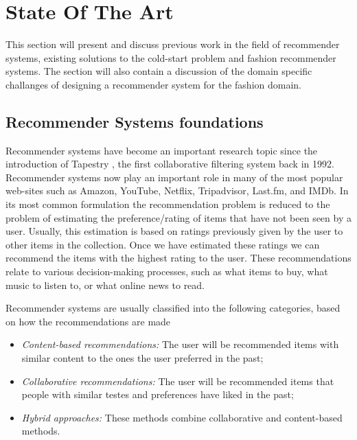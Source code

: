 
\section{State Of The Art}
\label{sec:SotA}

This section will present and discuss previous work in the field of recommender systems, existing solutions to the cold-start problem and fashion recommender systems. The section will also contain a discussion of the domain specific challanges of designing a recommender system for the fashion domain. 

\subsection{Recommender Systems foundations}

Recommender systems have become an important research topic since the introduction of Tapestry \cite{Goldberg1992}, the first collaborative filtering system back in 1992. Recommender systems now play an important role in many of the most popular web-sites such as Amazon, YouTube, Netflix, Tripadvisor, Last.fm, and IMDb. In its most common formulation the recommendation problem is reduced to the problem of estimating the preference/rating of items that have not been seen by a user. Usually, this estimation is based on ratings previously given by the user to other items in the collection. Once we have estimated these ratings we can recommend the items with the highest rating to the user. These recommendations relate to various decision-making processes, such as what items to buy, what music to listen to, or what online news to read.

Recommender systems are usually classified into the following categories, based on how the recommendations are made \cite{Adomavicius2005}

\begin{itemize}
\item \emph{Content-based recommendations:} The user will be recommended items with similar content to the ones the user preferred in the past;
\item \emph{Collaborative recommendations:} The user will be recommended items that people with similar testes and preferences have liked in the past;
\item \emph{Hybrid approaches:} These methods combine collaborative and content-based methods.
\end{itemize}

